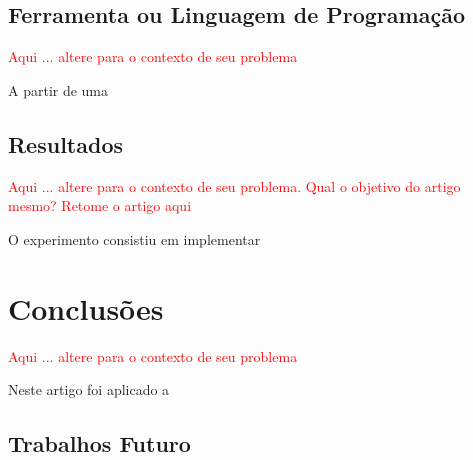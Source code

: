 \documentclass[12pt,final,a4paper]{article}
\theoremstyle{definition}
\begin{document}
\subsection{Ferramenta ou Linguagem de Programação}

{\Large \textcolor{red}{Aqui ... altere para o 
contexto de seu problema}}

A partir de uma 

\subsection{Resultados}


{\Large \textcolor{red}{Aqui ... altere para o 
contexto de seu problema. Qual o objetivo do 
artigo mesmo? Retome o artigo aqui}}

O experimento consistiu em implementar 



\section{Conclusões}
\label{sec:conclusao}


{\Large \textcolor{red}{Aqui ... altere para o 
contexto de seu problema}}


Neste artigo foi aplicado a 


\subsection{Trabalhos Futuro}



\end{document}
